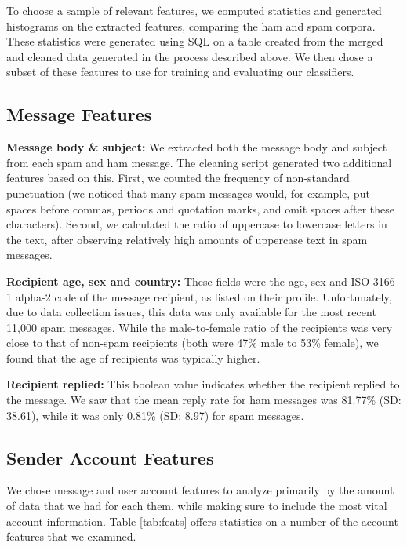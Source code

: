 \documentclass[preprint]{acm_proc_article-sp}
\begin{document}
To choose a sample of relevant features, we computed statistics and generated histograms on 
the extracted features, comparing the ham and spam corpora. These statistics were generated 
using SQL on a table created from the merged and cleaned data generated in the process described 
above. We then chose a subset of these features to use for training and evaluating our classifiers.

\subsection{Message Features}

\textbf{Message body \& subject:} We extracted both the message body and subject from 
each spam and ham message. The cleaning script generated two additional features based 
on this. First, we counted the frequency of non-standard punctuation (we noticed that many 
spam messages would, for example, put spaces before commas, periods and quotation marks, 
and omit spaces after these characters). Second, we calculated the ratio of uppercase to 
lowercase letters in the text, after observing relatively high amounts of uppercase text in 
spam messages.

\textbf{Recipient age, sex and country:} These fields were the age, sex and ISO 3166-1 alpha-2 code of the message 
recipient, as listed on their profile. Unfortunately, due to data collection issues, this data was only available 
for the most recent 11,000 spam messages. While the male-to-female ratio of the recipients was very close to that 
of non-spam recipients (both were 47\% male to 53\% female), we found that the age of recipients was typically higher.

\textbf{Recipient replied:} This boolean value indicates whether the recipient replied to the message. We saw 
that the mean reply rate for ham messages was 81.77\% (SD: 38.61), while it was only 0.81\% (SD: 8.97) for spam messages. 

\subsection{Sender Account Features}

We chose message and user account features to analyze primarily by the amount of data that 
we had for each them, while making sure to include the most vital account information. 
Table \ref{tab:feats} offers statistics on a number of the account features that we examined. 
\end{document}
